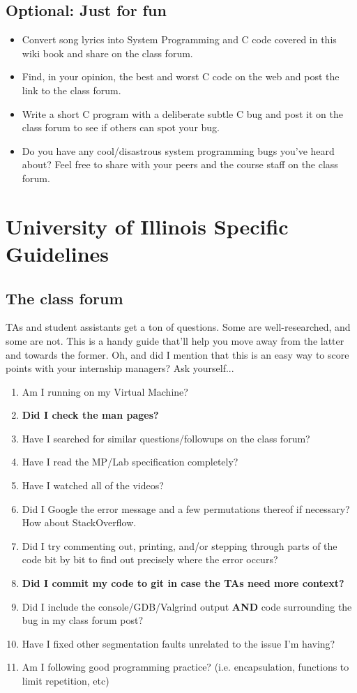 \subsection{Optional: Just for fun}

\begin{itemize}
\item Convert song lyrics into System Programming and C code covered in this wiki book and share on the class forum.
\item Find, in your opinion, the best and worst C code on the web and post the link to the class forum.
\item Write a short C program with a deliberate subtle C bug and post it on the class forum to see if others can spot your bug.
\item Do you have any cool/disastrous system programming bugs you've heard about? Feel free to share with your peers and the course staff on the class forum.
\end{itemize}

\section{University of Illinois Specific Guidelines}

\subsection{The class forum}

TAs and student assistants get a ton of questions.
Some are well-researched, and some are not.
This is a handy guide that'll help you move away from the latter and towards the former.
Oh, and did I mention that this is an easy way to score points with your internship managers? Ask yourself...

\begin{enumerate}
\item Am I running on my Virtual Machine?
\item \textbf{Did I check the man pages?}
\item Have I searched for similar questions/followups on the class forum?
\item Have I read the MP/Lab specification completely?
\item Have I watched all of the videos?
\item Did I Google the error message and a few permutations thereof if necessary? How about StackOverflow.
\item Did I try commenting out, printing, and/or stepping through parts of the code bit by bit to find out precisely where the error occurs?
\item \textbf{Did I commit my code to git in case the TAs need more context?}
\item Did I include the console/GDB/Valgrind output \textbf{AND} code surrounding the bug in my class forum post?
\item Have I fixed other segmentation faults unrelated to the issue I'm having?
\item Am I following good programming practice? (i.e. encapsulation, functions to limit repetition, etc)
\end{enumerate}

